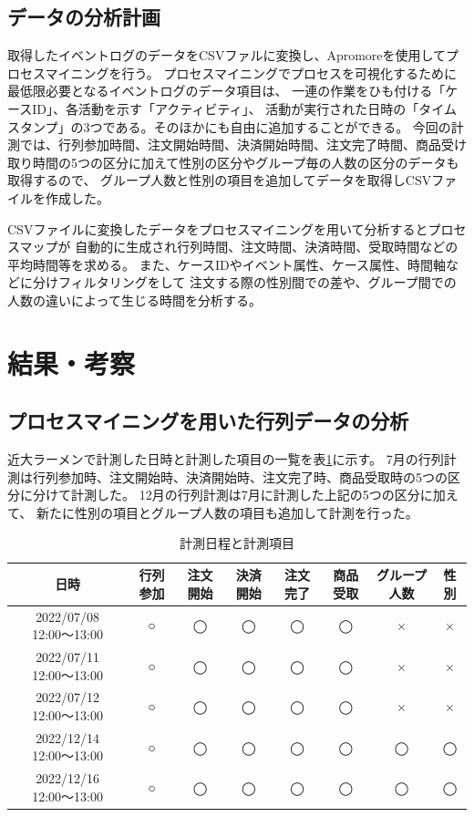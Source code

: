 \documentclass{jsarticle}
\begin{document}
\subsection{データの分析計画}
取得したイベントログのデータをCSVファルに変換し、Apromoreを使用してプロセスマイニングを行う。
プロセスマイニングでプロセスを可視化するために最低限必要となるイベントログのデータ項目は、
一連の作業をひも付ける「ケースID」、各活動を示す「アクティビティ」、
活動が実行された日時の「タイムスタンプ」の3つである。そのほかにも自由に追加することができる。
今回の計測では、行列参加時間、注文開始時間、決済開始時間、注文完了時間、商品受け取り時間の5つの区分に加えて性別の区分やグループ毎の人数の区分のデータも取得するので、
グループ人数と性別の項目を追加してデータを取得しCSVファイルを作成した。

CSVファイルに変換したデータをプロセスマイニングを用いて分析するとプロセスマップが
自動的に生成され行列時間、注文時間、決済時間、受取時間などの平均時間等を求める。
また、ケースIDやイベント属性、ケース属性、時間軸などに分けフィルタリングをして
注文する際の性別間での差や、グループ間での人数の違いによって生じる時間を分析する。




\newpage

\section{結果・考察}

\subsection{プロセスマイニングを用いた行列データの分析}

近大ラーメンで計測した日時と計測した項目の一覧を表\ref{table5}に示す。
7月の行列計測は行列参加時、注文開始時、決済開始時、注文完了時、商品受取時の5つの区分に分けて計測した。
12月の行列計測は7月に計測した上記の5つの区分に加えて、
新たに性別の項目とグループ人数の項目も追加して計測を行った。

\begin{table}[H]
 \begin{center}
   \caption{計測日程と計測項目}
   \begin{tabular}{|c|c|c|c|c|c|c|c|} \hline
日時 & 行列参加 & 注文開始 & 決済開始 & 注文完了 & 商品受取 & グループ人数 & 性別 \\ \hline \hline
2022/07/08 12:00〜13:00 & ○ & ◯ & ◯ & ◯ & ◯ & × & × \\ \hline
2022/07/11 12:00〜13:00 & ○ & ◯ & ◯ & ◯ & ◯ & × & × \\ \hline
2022/07/12 12:00〜13:00 & ○ & ◯ & ◯ & ◯ & ◯ & × & × \\ \hline
2022/12/14 12:00〜13:00 & ○ & ◯ & ◯ & ◯ & ◯ & ◯ & ◯ \\ \hline
2022/12/16 12:00〜13:00 & ○ & ◯ & ◯ & ◯ & ◯ & ◯ & ◯ \\ \hline
  \end{tabular}
 \label{table5}
 \end{center}
\end{table}
\end{document}
